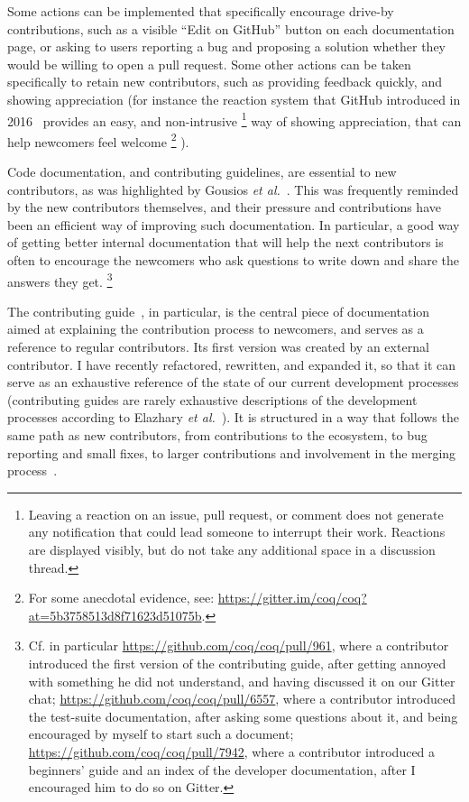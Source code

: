 Some actions can be implemented that specifically encourage drive-by contributions, such as a visible ``Edit on GitHub'' button on each documentation page, or asking to users reporting a bug and proposing a solution whether they would be willing to open a pull request. Some other actions can be taken specifically to retain new contributors, such as providing feedback quickly, and showing appreciation (for instance the reaction system that GitHub introduced in 2016~\cite{github_reactions} provides an easy, and non-intrusive%
\footnote{
	Leaving a reaction on an issue, pull request, or comment does not generate any notification that could lead someone to interrupt their work.
	Reactions are displayed visibly, but do not take any additional space in a discussion thread.
}
way of showing appreciation, that can help newcomers feel welcome%
\footnote{
	For some anecdotal evidence, see: \url{https://gitter.im/coq/coq?at=5b3758513d8f71623d51075b}.
}%
).

Code documentation, and contributing guidelines, are essential to new contributors, as was highlighted by Gousios \emph{et al.}~\cite{gousios2016work}.
This was frequently reminded by the new contributors themselves, and their pressure and contributions have been an efficient way of improving such documentation.
In particular, a good way of getting better internal documentation that will help the next contributors is often to encourage the newcomers who ask questions to write down and share the answers they get.%
\footnote{
	Cf. in particular \url{https://github.com/coq/coq/pull/961}, where a contributor introduced the first version of the contributing guide, after getting annoyed with something he did not understand, and having discussed it on our Gitter~\cite{gitter} chat; \url{https://github.com/coq/coq/pull/6557}, where a contributor introduced the test-suite documentation, after asking some questions about it, and being encouraged by myself to start such a document; \url{https://github.com/coq/coq/pull/7942}, where a contributor introduced a beginners' guide and an index of the developer documentation, after I encouraged him to do so on Gitter.
}

The contributing guide~\cite{coq_contributing_guide}, in particular, is the central piece of documentation aimed at explaining the contribution process to newcomers, and serves as a reference to regular contributors.
Its first version was created by an external contributor.
I have recently refactored, rewritten, and expanded it, so that it can serve as an exhaustive reference of the state of our current development processes (contributing guides are rarely exhaustive descriptions of the development processes according to Elazhary \emph{et al.}~\cite{elazhary2019not}).
It is structured in a way that follows the same path as new contributors, from contributions to the ecosystem, to bug reporting and small fixes, to larger contributions and involvement in the merging process~\cite{jensen2007role, nakakoji2002evolution, ye2003toward}.

